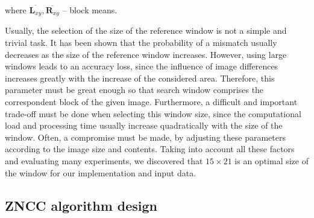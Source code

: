 \documentclass[conference]{IEEEtran}
\begin{document}
\noindent where $\overline{\mathbf{L}_{xy}},\overline{\mathbf{R}_{xy}}$ -- block means.

Usually, the selection of the size of the reference window is not a simple and trivial task. It has been shown that the probability of a mismatch usually decreases as the size of the reference window increases. However, using large windows leads to an accuracy loss, since the influence of image differences increases greatly with the increase of the considered area. Therefore, this parameter must be great enough so that search window comprises the correspondent block of the given image. Furthermore, a difficult and important trade-off must be done when selecting this window size, since the computational load and processing time usually increase quadratically with the size of the window. Often, a compromise must be made, by adjusting these parameters according to the image size and contents. Taking into account all these factors and evaluating many experiments, we discovered that $15 \times 21$ is an optimal size of the window for our implementation and input data.

\subsection{ZNCC algorithm design}
\end{document}
